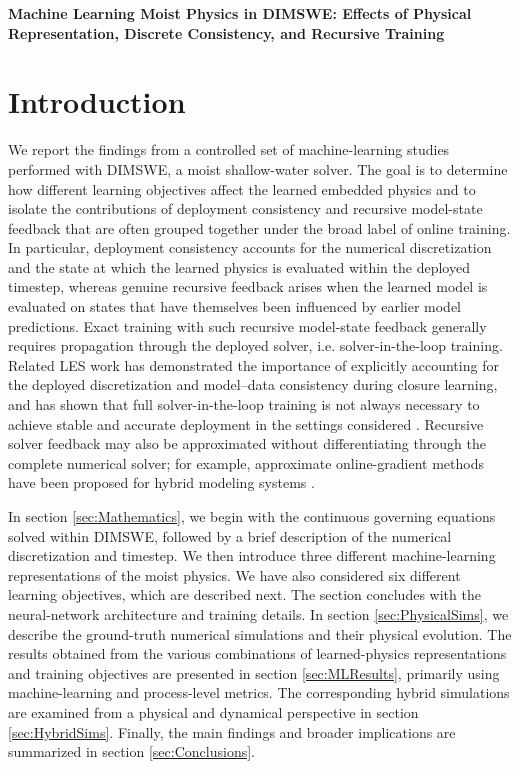 \documentclass[12pt]{article}
\begin{document}
	
	\begin{center}
		\large{\textbf{Machine Learning Moist Physics in DIMSWE: Effects of Physical Representation, Discrete Consistency, and Recursive Training}}
	\end{center}	
	\section{Introduction}
	We report the findings from a controlled set of machine-learning studies performed with DIMSWE, a moist shallow-water solver. The goal is to determine how different learning objectives affect the learned embedded physics and to isolate the contributions of deployment consistency and recursive model-state feedback that are often grouped together under the broad label of online	training. In particular, deployment consistency accounts for the numerical discretization and the state at which the learned physics is evaluated within	the deployed timestep, whereas genuine recursive feedback arises when the learned model is evaluated on states that have themselves been influenced by earlier model predictions. Exact training with such recursive model-state	feedback generally requires propagation through the deployed solver, i.e. solver-in-the-loop training. Related LES work has demonstrated the importance of explicitly accounting for the deployed discretization and model--data consistency during closure learning, and has shown that full solver-in-the-loop training is not always necessary to achieve stable and accurate deployment in the settings considered \cite{agdestein2025discretize}. Recursive solver feedback may also be approximated without differentiating through the complete numerical solver; for example, approximate online-gradient	methods have been proposed for hybrid modeling systems \cite{ouala2024online}.
		
	In section \ref{sec:Mathematics}, we begin with the continuous governing equations solved within DIMSWE, followed by a brief description of the numerical discretization and timestep. We then introduce three different machine-learning representations of the moist physics. We have also considered six different learning objectives, which are described next. The section concludes with the neural-network architecture and training details. In section \ref{sec:PhysicalSims}, we describe the ground-truth numerical simulations and their physical evolution. The results obtained from the various combinations of learned-physics representations and training objectives are presented in section \ref{sec:MLResults}, primarily using machine-learning and process-level metrics. The corresponding hybrid simulations are examined from a physical and dynamical perspective in section \ref{sec:HybridSims}. Finally, the main findings and broader implications are summarized in section \ref{sec:Conclusions}.
	
\end{document}
